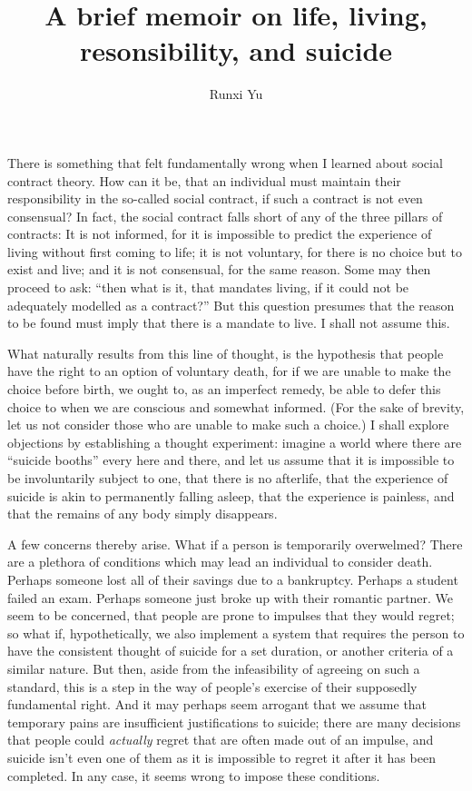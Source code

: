 \documentclass{scrartcl}
\title{A brief memoir on life, living, resonsibility, and suicide}
\author{Runxi Yu}
\date{}
\begin{document}
\maketitle

There is something that felt fundamentally wrong when I learned about
social contract theory. How can it be, that an individual must maintain
their responsibility in the so-called social contract, if such a
contract is not even consensual? In fact, the social contract falls
short of any of the three pillars of contracts: It is not informed, for
it is impossible to predict the experience of living without first
coming to life; it is not voluntary, for there is no choice but to exist
and live; and it is not consensual, for the same reason. Some may then
proceed to ask: ``then what is it, that mandates living, if it could not
be adequately modelled as a contract?'' But this question presumes that
the reason to be found must imply that there is a mandate to live. I
shall not assume this.

What naturally results from this line of thought, is the hypothesis that
people have the right to an option of voluntary death, for if we are
unable to make the choice before birth, we ought to, as an imperfect
remedy, be able to defer this choice to when we are conscious and
somewhat informed. (For the sake of brevity, let us not consider those
who are unable to make such a choice.) I shall explore objections by
establishing a thought experiment: imagine a world where there are
``suicide booths'' every here and there, and let us assume that it is
impossible to be involuntarily subject to one, that there is no
afterlife, that the experience of suicide is akin to permanently falling
asleep, that the experience is painless, and that the remains of any
body simply disappears.

A few concerns thereby arise. What if a person is temporarily
overwelmed? There are a plethora of conditions which may lead an
individual to consider death. Perhaps someone lost all of their savings
due to a bankruptcy. Perhaps a student failed an exam. Perhaps someone
just broke up with their romantic partner. We seem to be concerned, that
people are prone to impulses that they would regret; so what if,
hypothetically, we also implement a system that requires the person to
have the consistent thought of suicide for a set duration, or another
criteria of a similar nature.  But then, aside from the infeasibility of
agreeing on such a standard, this is a step in the way of people's
exercise of their supposedly fundamental right. And it may perhaps seem
arrogant that we assume that temporary pains are insufficient
justifications to suicide; there are many decisions that people could
\emph{actually} regret that are often made out of an impulse, and
suicide isn't even one of them as it is impossible to regret it after it
has been completed. In any case, it seems wrong to impose these
conditions.
\end{document}
